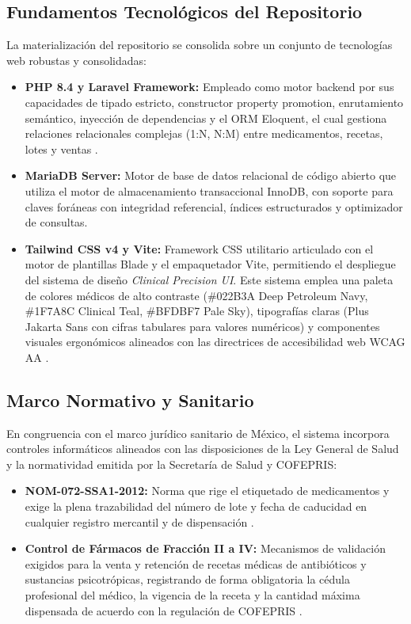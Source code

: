 \subsection{Fundamentos Tecnológicos del Repositorio}
La materialización del repositorio se consolida sobre un conjunto de tecnologías web robustas y consolidadas:
\begin{itemize}
    \item \textbf{PHP 8.4 y Laravel Framework:} Empleado como motor backend por sus capacidades de tipado estricto, constructor property promotion, enrutamiento semántico, inyección de dependencias y el ORM Eloquent, el cual gestiona relaciones relacionales complejas (1:N, N:M) entre medicamentos, recetas, lotes y ventas \cite{otwell2024laravel}.
    \item \textbf{MariaDB Server:} Motor de base de datos relacional de código abierto que utiliza el motor de almacenamiento transaccional InnoDB, con soporte para claves foráneas con integridad referencial, índices estructurados y optimizador de consultas.
    \item \textbf{Tailwind CSS v4 y Vite:} Framework CSS utilitario articulado con el motor de plantillas Blade y el empaquetador Vite, permitiendo el despliegue del sistema de diseño \textit{Clinical Precision UI}. Este sistema emplea una paleta de colores médicos de alto contraste (\#022B3A Deep Petroleum Navy, \#1F7A8C Clinical Teal, \#BFDBF7 Pale Sky), tipografías claras (Plus Jakarta Sans con cifras tabulares para valores numéricos) y componentes visuales ergonómicos alineados con las directrices de accesibilidad web WCAG AA \cite{w3c2018wcag}.
\end{itemize}

\subsection{Marco Normativo y Sanitario}
En congruencia con el marco jurídico sanitario de México, el sistema incorpora controles informáticos alineados con las disposiciones de la Ley General de Salud y la normatividad emitida por la Secretaría de Salud y COFEPRIS:
\begin{itemize}
    \item \textbf{NOM-072-SSA1-2012:} Norma que rige el etiquetado de medicamentos y exige la plena trazabilidad del número de lote y fecha de caducidad en cualquier registro mercantil y de dispensación \cite{nom072ssa1}.
    \item \textbf{Control de Fármacos de Fracción II a IV:} Mecanismos de validación exigidos para la venta y retención de recetas médicas de antibióticos y sustancias psicotrópicas, registrando de forma obligatoria la cédula profesional del médico, la vigencia de la receta y la cantidad máxima dispensada de acuerdo con la regulación de COFEPRIS \cite{cofepris2020}.
\end{itemize}
